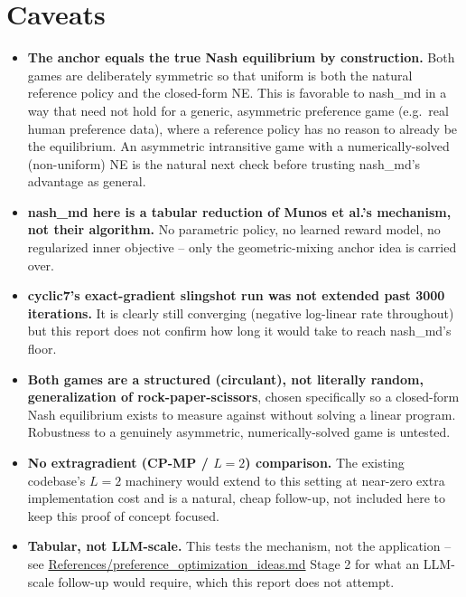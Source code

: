 \documentclass[11pt]{article}
\begin{document}
\section{Caveats}
\label{sec:caveats}
\begin{itemize}
  \item \textbf{The anchor equals the true Nash equilibrium by
  construction.} Both games are deliberately symmetric so that uniform is
  both the natural reference policy and the closed-form NE. This is
  favorable to nash\_md in a way that need not hold for a generic, asymmetric
  preference game (e.g.\ real human preference data), where a reference
  policy has no reason to already be the equilibrium. An asymmetric
  intransitive game with a numerically-solved (non-uniform) NE is the
  natural next check before trusting nash\_md's advantage as general.
  \item \textbf{nash\_md here is a tabular reduction of Munos et al.'s
  mechanism, not their algorithm.} No parametric policy, no learned
  reward model, no regularized inner objective -- only the geometric-mixing
  anchor idea is carried over.
  \item \textbf{cyclic7's exact-gradient slingshot run was not extended
  past 3000 iterations.} It is clearly still converging (negative log-linear
  rate throughout) but this report does not confirm how long it would take
  to reach nash\_md's floor.
  \item \textbf{Both games are a structured (circulant), not literally
  random, generalization of rock-paper-scissors}, chosen specifically so a
  closed-form Nash equilibrium exists to measure against without solving a
  linear program. Robustness to a genuinely asymmetric, numerically-solved
  game is untested.
  \item \textbf{No extragradient (CP-MP / $L=2$) comparison.} The existing
  codebase's $L=2$ machinery would extend to this setting at near-zero extra
  implementation cost and is a natural, cheap follow-up, not included here
  to keep this proof of concept focused.
  \item \textbf{Tabular, not LLM-scale.} This tests the mechanism, not the
  application -- see \url{References/preference_optimization_ideas.md}
  Stage 2 for what an LLM-scale follow-up would require, which this report
  does not attempt.
\end{itemize}
\end{document}

